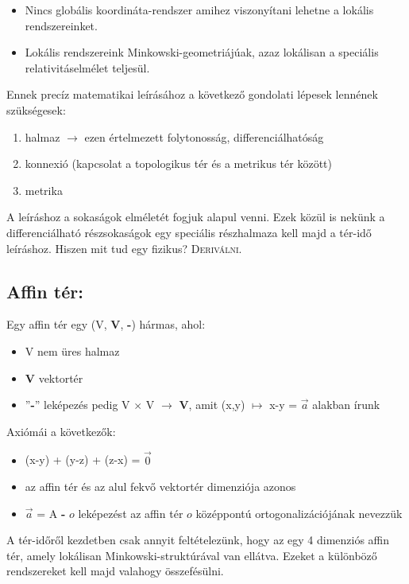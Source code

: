 \documentclass[a4paper, 12pt]{article}
\begin{document}
\begin{itemize}
\item Nincs globális koordináta-rendszer amihez viszonyítani lehetne a lokális rendszereinket.
\item Lokális rendszereink Minkowski-geometriájúak, azaz lokálisan a speciális relativitáselmélet teljesül.
\end{itemize}
\par
Ennek precíz matematikai leírásához a következő gondolati lépesek lennének szükségesek:
\begin{enumerate}
\item halmaz $\rightarrow$ ezen értelmezett folytonosság, differenciálhatóság
\item konnexió (kapcsolat a topologikus tér és a metrikus tér között)
\item metrika
\end{enumerate}
A leíráshoz a sokaságok elméletét fogjuk alapul venni. Ezek közül is nekünk a differenciálható részsokaságok egy speciális részhalmaza kell majd a tér-idő leíráshoz. Hiszen mit tud egy fizikus? \textsc{Deriválni.}
\subsection{Affin tér:}
Egy affin tér egy (V, \textbf{V}, \textbf{-}) hármas, ahol:
\begin{itemize}
\item V nem üres halmaz
\item \textbf{V} vektortér
\item ''\textbf{-}'' leképezés pedig V  $\times$ V $\rightarrow$ \textbf{V}, amit (x,y) $\mapsto$ x-y = $\vec{a}$ alakban írunk
\end{itemize}
Axiómái a következők:
\begin{itemize}
\item (x-y) + (y-z) + (z-x) = $\vec{0}$
\item az affin tér és az alul fekvő vektortér dimenziója azonos
\item $\vec{a}$ = A \textbf{-} $o$ leképezést az affin tér $o$ középpontú ortogonalizációjának nevezzük
\end{itemize}
A tér-időről kezdetben csak annyit feltételezünk, hogy az egy 4 dimenziós affin tér, amely lokálisan Minkowski-struktúrával van ellátva. Ezeket a különböző rendszereket kell majd valahogy összefésülni.
\end{document}
